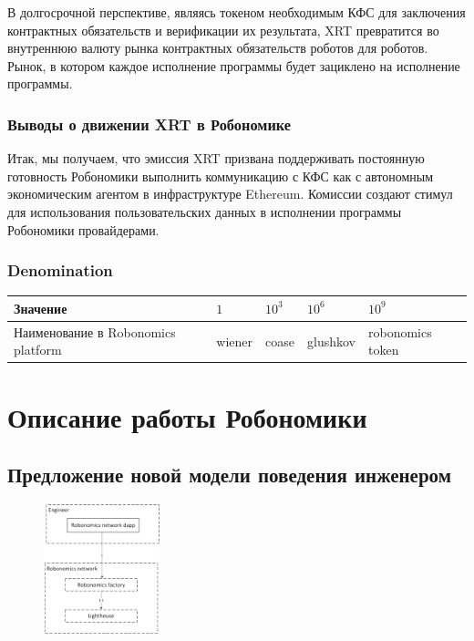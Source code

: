 \documentclass{article}
\begin{document}
В долгосрочной перспективе, являясь токеном необходимым КФС для заключения контрактных обязательств и верификации их результата, XRT превратится во внутреннюю валюту рынка контрактных обязательств роботов для роботов. Рынок, в котором каждое исполнение программы будет зациклено на исполнение программы.

\subsubsection{Выводы о движении XRT в Робономике}

Итак, мы получаем, что эмиссия XRT призвана поддерживать постоянную готовность Робономики выполнить коммуникацию с КФС как с автономным экономическим агентом в инфраструктуре Ethereum. Комиссии создают стимул для использования пользовательских данных в исполнении программы Робономики провайдерами.

\subsubsection{Denomination }
\begin{tabular}{ l |l |l |l |l}
 Значение &  $1$ & $10^3$ & $10^6$  & $10^9$ \\ 
 \hline
 Наименование в Robonomics platform &  wiener & coase  & glushkov & robonomics token\\ 
\end{tabular}

\section{Описание работы Робономики}
\subsection{Предложение новой модели поведения инженером}

\begin{figure} %
    \centering
    \includegraphics[width=0.30\textwidth]{step-by-step-1.png}
\end{figure}
\end{document}
